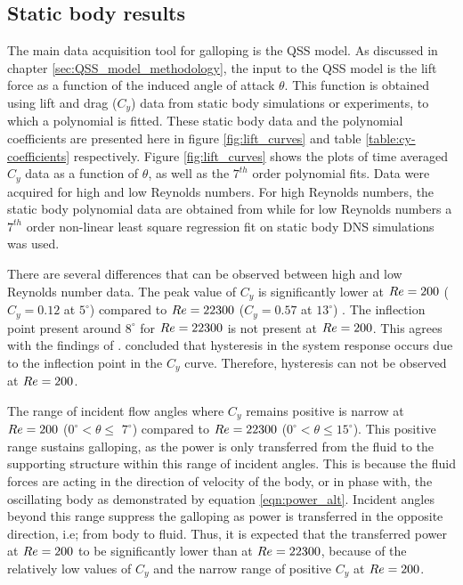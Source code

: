 \subsection{Static body results}

The main data acquisition tool for galloping is the QSS model. As discussed in chapter \ref{sec:QSS_model_methodology}, the input to the QSS model is the lift force as a function of the induced angle of attack $\theta$. This function is obtained using lift and drag ($C_y$) data from static body simulations or experiments, to which a polynomial is fitted. These static body data and the polynomial coefficients are presented here in figure \ref{fig:lift_curves} and table \ref{table:cy-coefficients} respectively.  Figure \ref{fig:lift_curves} shows the plots of time averaged $C_y$ data as a function of $\theta$, as well as the $7^{th}$ order polynomial fits. Data were acquired for high and low Reynolds numbers. For high Reynolds numbers, the static body polynomial data are obtained from \cite{Parkinson1964} while for low Reynolds numbers a $7^{th}$ order non-linear least square regression fit on static body DNS simulations was used.





There are several differences that can be observed between high and low Reynolds number data. The peak value of $C_y$ is  significantly lower at $Re=200$ ($C_y=0.12$ at $5^\circ$) compared to $Re=22300$ ($C_y=0.57$ at $13^\circ$) . The inflection point present around $8^\circ$ for $Re=22300$ is not present at $Re=200$. This agrees with the findings of \cite{Luo2003}. \cite{Luo2003} concluded that hysteresis in the system response occurs due to the inflection point in the $C_y$ curve. Therefore, hysteresis can not be observed at $Re=200$.

The range of incident flow angles where $C_y$ remains positive is narrow at $Re=200$ ($0^\circ <\theta \leq$ $7^\circ$) compared to $Re=22300$ ($0^\circ <\theta \leq 15^\circ$). This positive range sustains galloping, as the power is only transferred from the fluid to the supporting structure within this range of incident angles. This is because the fluid forces are acting in the 
direction of velocity of the body, or in phase with, the oscillating body as demonstrated by equation \ref{eqn:power_alt}. Incident angles beyond this range suppress the galloping as power is transferred in the opposite direction, i.e; from body to fluid. Thus, it is expected that the transferred power at $Re=200$ to be significantly lower than at $Re=22300$, because of the relatively low values of $C_y$ and the narrow range of positive $C_y$ at $Re=200$.



